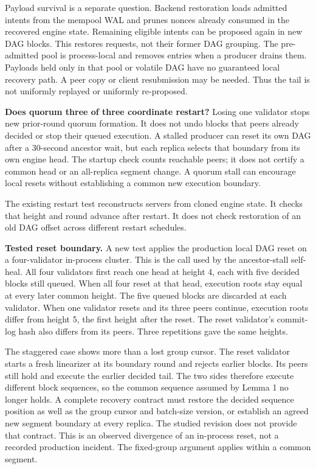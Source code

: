 \documentclass[11pt]{article}
\begin{document}
Payload survival is a separate question. Backend restoration loads admitted intents from the mempool WAL and prunes nonces already consumed in the recovered engine state. Remaining eligible intents can be proposed again in new DAG blocks. This restores requests, not their former DAG grouping. The pre-admitted pool is process-local and removes entries when a producer drains them. Payloads held only in that pool or volatile DAG have no guaranteed local recovery path. A peer copy or client resubmission may be needed. Thus the tail is not uniformly replayed or uniformly re-proposed. \cite{R12}

\textbf{Does quorum three of three coordinate restart?} Losing one validator stops new prior-round quorum formation. It does not undo blocks that peers already decided or stop their queued execution. A stalled producer can reset its own DAG after a 30-second ancestor wait, but each replica selects that boundary from its own engine head. The startup check counts reachable peers; it does not certify a common head or an all-replica segment change. A quorum stall can encourage local resets without establishing a common new execution boundary. \cite{R12}

The existing restart test reconstructs servers from cloned engine state. It checks that height and round advance after restart. It does not check restoration of an old DAG offset across different restart schedules. \cite{R12,R14}

\textbf{Tested reset boundary.} A new test applies the production local DAG reset on a four-validator in-process cluster. This is the call used by the ancestor-stall self-heal. All four validators first reach one head at height 4, each with five decided blocks still queued. When all four reset at that head, execution roots stay equal at every later common height. The five queued blocks are discarded at each validator. When one validator resets and its three peers continue, execution roots differ from height 5, the first height after the reset. The reset validator's commit-log hash also differs from its peers. Three repetitions gave the same heights. \cite{R30}

The staggered case shows more than a lost group cursor. The reset validator starts a fresh linearizer at its boundary round and rejects earlier blocks. Its peers still hold and execute the earlier decided tail. The two sides therefore execute different block sequences, so the common sequence assumed by Lemma 1 no longer holds. A complete recovery contract must restore the decided sequence position as well as the group cursor and batch-size version, or establish an agreed new segment boundary at every replica. The studied revision does not provide that contract. This is an observed divergence of an in-process reset, not a recorded production incident. The fixed-group argument applies within a common segment. \cite{R12,R30}
\end{document}
